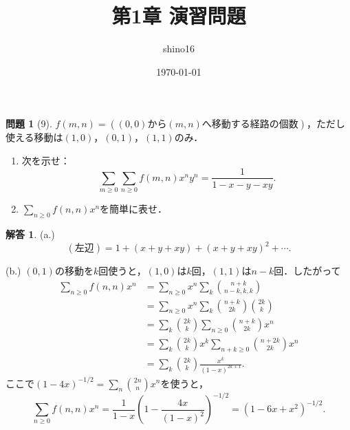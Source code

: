 \documentclass[xelatex,ja=standard,a4paper,14pt,everyparhook=compat]{bxjsarticle}
\title{第1章 演習問題}
\author{shino16}
\date{\today}
\newcommand{\paren}[1]{\left(#1\right)}
\theoremstyle{definition}
\newtheorem*{problem}{問題}
\newtheorem*{answer}{解答}
\begin{document}
\maketitle

\newpage

\begin{problem}[9]
$f(m,n) = (\text{$(0,0)$から$(m,n)$へ移動する経路の個数})$，ただし使える移動は$(1,0)$，$(0,1)$，$(1,1)$のみ．
\begin{enumerate}
    \item 次を示せ： \begin{equation*}
              \sum_{m \geq 0} \sum_{n \geq 0} f(m,n) x^n y^n = \frac{1}{1-x-y-xy}.
          \end{equation*}
    \item $\sum_{n \geq 0} f(n,n) x^n$を簡単に表せ．
\end{enumerate}
\end{problem}
\begin{answer}
    (a.) \begin{equation*}
        (\text{左辺}) = 1 + (x+y+xy) + (x+y+xy)^2 + \cdots.
    \end{equation*}

    (b.) $(0,1)$の移動を$k$回使うと，$(1,0)$は$k$回，$(1,1)$は$n-k$回．したがって \begin{align*}
        \sum_{n \geq 0} f(n,n) x^n
         & = \sum_{n \geq 0} x^n \sum_k \binom{n+k}{n-k,k,k}                 \\
         & = \sum_{n \geq 0} x^n \sum_k \binom{n+k}{2k} \binom{2k}{k}        \\
         & = \sum_k \binom{2k}{k} \sum_{n \geq 0} \binom{n+k}{2k} x^n        \\
         & = \sum_k \binom{2k}{k} x^k \sum_{n+k \geq 0} \binom{n+2k}{2k} x^n \\
         & = \sum_k \binom{2k}{k} \frac{x^k}{(1-x)^{2k+1}}.
    \end{align*}
    ここで$(1-4x)^{-1/2} = \sum_n \binom{2n}{n} x^n$を使うと， \begin{equation*}
        \sum_{n \geq 0} f(n,n) x^n = \frac{1}{1-x} \paren{1-\frac{4x}{(1-x)^2}}^{-1/2} = (1-6x+x^2)^{-1/2}.
    \end{equation*}
\end{answer}
\end{document}
